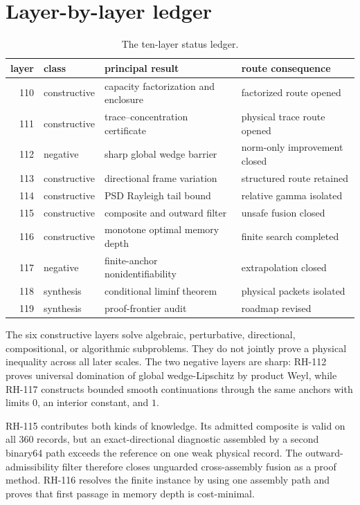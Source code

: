 \documentclass[12pt]{article}
\begin{document}
\section{Layer-by-layer ledger}
\begin{table}[h]
\centering
\small
\begin{tabular}{rlll}
\toprule
layer & class & principal result & route consequence\\
\midrule
110 & constructive & capacity factorization and enclosure & factorized route opened\\
111 & constructive & trace--concentration certificate & physical trace route opened\\
112 & negative & sharp global wedge barrier & norm-only improvement closed\\
113 & constructive & directional frame variation & structured route retained\\
114 & constructive & PSD Rayleigh tail bound & relative gamma isolated\\
115 & constructive & composite and outward filter & unsafe fusion closed\\
116 & constructive & monotone optimal memory depth & finite search completed\\
117 & negative & finite-anchor nonidentifiability & extrapolation closed\\
118 & synthesis & conditional liminf theorem & physical packets isolated\\
119 & synthesis & proof-frontier audit & roadmap revised\\
\bottomrule
\end{tabular}
\caption{The ten-layer status ledger.}
\end{table}

The six constructive layers solve algebraic, perturbative, directional,
compositional, or algorithmic subproblems.  They do not jointly prove a
physical inequality across all later scales.  The two negative layers are
sharp: RH-112 proves universal domination of global wedge-Lipschitz by
product Weyl, while RH-117 constructs bounded smooth continuations through
the same anchors with limits $0$, an interior constant, and $1$.

RH-115 contributes both kinds of knowledge.  Its admitted composite is
valid on all 360 records, but an exact-directional diagnostic assembled by a
second binary64 path exceeds the reference on one weak physical record.  The
outward-admissibility filter therefore closes unguarded cross-assembly fusion
as a proof method.  RH-116 resolves the finite instance by using one assembly
path and proves that first passage in memory depth is cost-minimal.
\end{document}
